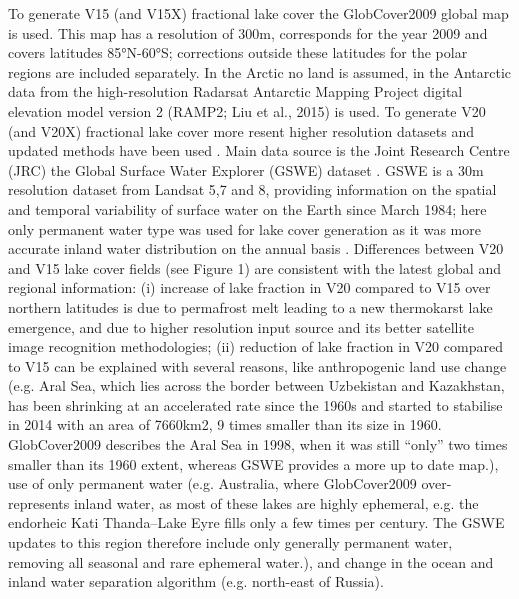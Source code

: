 \documentclass[hess, twostagejnl]{copernicus}
\begin{document}
\noindent To generate V15 (and V15X) fractional lake cover the GlobCover2009 global map  \citep{GLOBCOVER,arino2012glcm} is used. This map has a resolution of 300m, corresponds for the year 2009 and covers latitudes 85°N-60°S; corrections outside these latitudes for the polar regions are included separately. In the Arctic no land is assumed, in the Antarctic data from the high-resolution Radarsat Antarctic Mapping Project digital elevation model version 2 (RAMP2; Liu et al., 2015) is used. To generate V20 (and V20X) fractional lake cover more resent higher resolution datasets and updated methods have been used \citep{Choulga2019}. Main data source is the Joint Research Centre (JRC) the Global Surface Water Explorer (GSWE) dataset \citep{GSWE}. GSWE is a 30m resolution dataset from Landsat 5,7 and 8, providing information on the spatial and temporal variability of surface water on the Earth since March 1984; here only permanent water type was used for lake cover generation as it was more accurate inland water distribution on the annual basis \citep{Choulga2019}. Differences between V20 and V15 lake cover fields (see Figure 1) are consistent with the latest global and regional information: (i) increase of lake fraction in V20 compared to V15 over northern latitudes is due to permafrost melt leading to a new thermokarst lake emergence, and due to higher resolution input source and its better satellite image recognition methodologies; (ii) reduction of lake fraction in V20 compared to V15 can be explained with several reasons, like anthropogenic land use change (e.g. Aral Sea, which lies across the border between Uzbekistan and Kazakhstan, has been shrinking at an accelerated rate since the 1960s and started to stabilise in 2014 with an area of 7660km2, 9 times smaller than its size in 1960. GlobCover2009 describes the Aral Sea in 1998, when it was still “only” two times smaller than its 1960 extent, whereas GSWE provides a more up to date map.), use of only permanent water (e.g. Australia, where GlobCover2009 over-represents inland water, as most of these lakes are highly ephemeral, e.g. the endorheic Kati Thanda–Lake Eyre fills only a few times per century. The GSWE updates to this region therefore include only generally permanent water, removing all seasonal and rare ephemeral water.), and change in the ocean and inland water separation algorithm (e.g. north-east of Russia). \newline 
\end{document}
